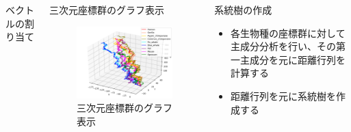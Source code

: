 \documentclass[uplatex,dvipdfmx]{beamer}
\begin{document}
\begin{frame}[t]
\begin{columns}[T,onlytextwidth]
\begin{block}{ベクトルの割り当て}
    \end{block}



    \begin{block}{三次元座標群のグラフ表示}
      
      \begin{figure}[htbp]
        \centering
        \includegraphics[width=150mm]{pic2.png}
        \caption{三次元座標群のグラフ表示}
      \end{figure}

    \end{block}

    \begin{block}{系統樹の作成}
      
      \begin{itemize}
        \item {各生物種の座標群に対して主成分分析を行い、その第一主成分を元に距離行列\cite{bunken}を計算する}
        \item {距離行列を元に系統樹を作成する}
      \end{itemize}


\end{block}
\end{columns}
\end{frame}
\end{document}
